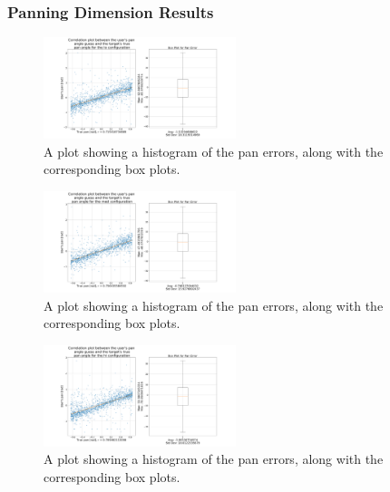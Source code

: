 \documentclass[format=sigconf, review=true, screen=true, anonymous=true]{acmart}
\begin{document}
\subsubsection{Panning Dimension Results}


\begin{figure}
  \centering
  \includegraphics[width=0.5\textwidth]{figures/pan_err_lo.png}
  \caption{A plot showing a histogram of the pan errors, along with the corresponding box plots. }
  \label{fig:pan-err-lo}
\end{figure}

\begin{figure}
  \centering
  \includegraphics[width=0.5\textwidth]{figures/pan_err_med.png}
  \caption{A plot showing a histogram of the pan errors, along with the corresponding box plots. }
  \label{fig:pan-err-med}
\end{figure}

\begin{figure}
  \centering
  \includegraphics[width=0.5\textwidth]{figures/pan_err_hi.png}
  \caption{A plot showing a histogram of the pan errors, along with the corresponding box plots. }
  \label{fig:location-guesses}
  \label{fig:pan-err-hi}
\end{figure}
\end{document}
